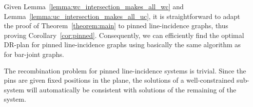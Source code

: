 Given Lemma~\ref{lemma:wc_intersection_makes_all_wc} and Lemma~\ref{lemma:uc_intersection_makes_all_uc},
it is straightforward to adapt the proof of Theorem~\ref{theorem:main}
to  pinned line-incidence graphs,
thus proving Corollary~\ref{cor:pinned}.
Consequently, we can efficiently find the optimal DR-plan for  pinned line-incidence graphs using basically the same algorithm as for  bar-joint graphs.

\noindent
\note The recombination problem for  pinned line-incidence systems is trivial.
Since the pins are given fixed positions in the plane,
the solutions of a well-constrained sub-system will automatically be consistent with solutions of the remaining of the system.


